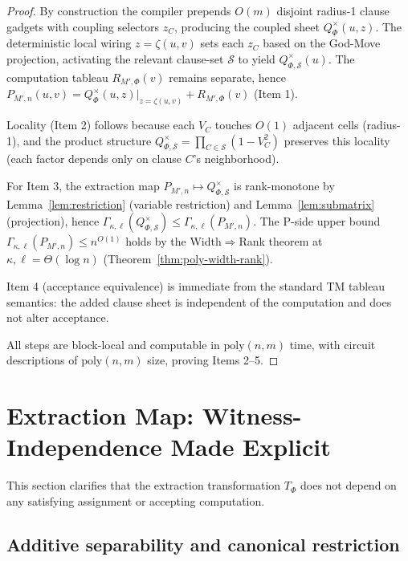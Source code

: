 \documentclass[12pt]{article}
\theoremstyle{definition}
\theoremstyle{definition}
\theoremstyle{remark}
\theoremstyle{remark}
\begin{document}
\begin{proof}
By construction the compiler prepends $O(m)$ disjoint radius-1 clause gadgets with coupling
selectors $z_C$, producing the coupled sheet $Q_\Phi^{\times}(u,z)$. The deterministic local
wiring $z=\zeta(u,v)$ sets each $z_C$ based on the God-Move projection, activating the relevant
clause-set $\mathcal{S}$ to yield $Q_{\Phi,\mathcal{S}}^{\times}(u)$.
The computation tableau $R_{M',\Phi}(v)$ remains separate, hence $P_{M',n}(u,v)=Q_\Phi^{\times}(u,z)|_{z=\zeta(u,v)}+R_{M',\Phi}(v)$ (Item 1).

Locality (Item 2) follows because each $V_C$ touches $O(1)$ adjacent cells (radius-1),
and the product structure $Q_{\Phi,\mathcal{S}}^{\times} = \prod_{C\in\mathcal{S}}(1-V_C^2)$
preserves this locality (each factor depends only on clause $C$'s neighborhood).

For Item 3, the extraction map $P_{M',n} \mapsto Q_{\Phi,\mathcal{S}}^{\times}$ is
rank-monotone by Lemma~\ref{lem:restriction} (variable restriction) and
Lemma~\ref{lem:submatrix} (projection), hence
$\Gamma_{\kappa,\ell}(Q_{\Phi,\mathcal{S}}^{\times})\le \Gamma_{\kappa,\ell}(P_{M',n})$.
The P-side upper bound $\Gamma_{\kappa,\ell}(P_{M',n})\le n^{O(1)}$ holds by the
Width$\Rightarrow$Rank theorem at $\kappa,\ell=\Theta(\log n)$ (Theorem~\ref{thm:poly-width-rank}).

Item 4 (acceptance equivalence) is immediate from the standard TM tableau semantics:
the added clause sheet is independent of the computation and does not alter acceptance.

All steps are block-local and computable in $\mathrm{poly}(n,m)$ time, with circuit
descriptions of $\mathrm{poly}(n,m)$ size, proving Items 2--5.
\end{proof}

\section{Extraction Map: Witness-Independence Made Explicit}
\label{sec:extraction-clarified}

This section clarifies that the extraction transformation $T_{\Phi}$ does
not depend on any satisfying assignment or accepting computation.

\subsection{Additive separability and canonical restriction}
\label{subsec:canonical-restriction}
\end{document}

